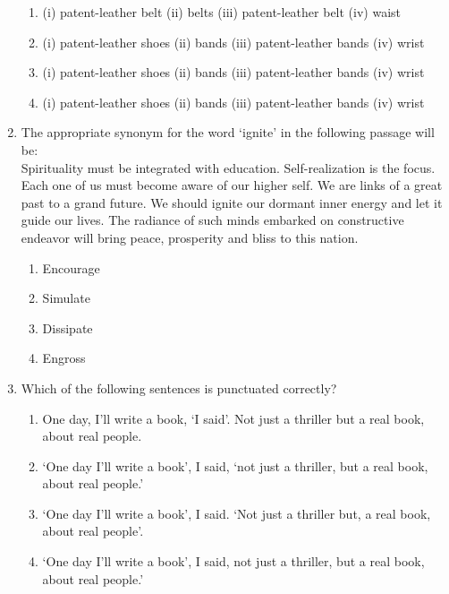 \documentclass{article}
\begin{document}
\begin{enumerate}[leftmargin=*, start=11, label=Q.\arabic*.]
    \begin{enumerate}
        \item (i) patent-leather belt (ii) belts (iii) patent-leather belt (iv) waist
        \item (i) patent-leather shoes (ii) bands (iii) patent-leather bands (iv) wrist
        \item (i) patent-leather shoes (ii) bands (iii) patent-leather bands (iv) wrist
        \item (i) patent-leather shoes (ii) bands (iii) patent-leather bands (iv) wrist
    \end{enumerate} 

    \item The appropriate synonym for the word ‘ignite’ in the following passage will be: \\ Spirituality must be integrated with education. Self-realization is the focus. Each one of us must become aware of our higher self. We are links of a great past to a grand future. We should ignite our dormant inner energy and let it guide our lives. The radiance of such minds embarked on constructive endeavor will bring peace, prosperity and bliss to this nation.
    
    \begin{multicols}{4}
        \begin{enumerate}
            \item Encourage
            \item Simulate
            \item Dissipate
            \item Engross
        \end{enumerate}
    \end{multicols}

    \item Which of the following sentences is punctuated correctly?
    
    \begin{enumerate}
        \item One day, I’ll write a book, ‘I said’. Not just a thriller but a real book, about real people.
        \item ‘One day I’ll write a book’, I said, ‘not just a thriller, but a real book, about real people.’
        \item ‘One day I’ll write a book’, I said. ‘Not just a thriller but, a real book, about real people’.
        \item ‘One day I’ll write a book’, I said, not just a thriller, but a real book, about real people.’
    \end{enumerate}


\end{enumerate}
\end{document}
